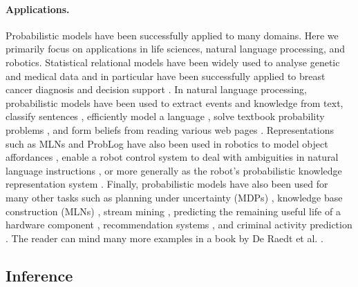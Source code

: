 \documentclass{article}
\begin{document}
\paragraph{Applications.}
Probabilistic models have been successfully applied to many domains. Here we
primarily focus on applications in life sciences, natural language processing,
and robotics. Statistical relational models have been widely used to analyse
genetic \cite{DBLP:journals/nar/MaeyerWRRM15,DBLP:journals/jcb/SakhanenkoG12}
and medical \cite{DBLP:conf/iaai/NatarajanKIJC13} data and in particular have
been successfully applied to breast cancer diagnosis and decision support
\cite{DBLP:conf/ilp/Corte-RealD017,DBLP:conf/pkdd/NassifKBPSC13}. In natural
language processing, probabilistic models have been used to extract events
\cite{DBLP:conf/emnlp/VenugopalCGN14} and knowledge
\cite{DBLP:conf/naacl/PoonV10} from text, classify sentences
\cite{DBLP:conf/emnlp/VerbekeAMFDR12}, efficiently model a language
\cite{DBLP:conf/icml/JerniteRS15}, solve textbook probability problems
\cite{DBLP:conf/ijcai/DriesKDBR17}, and form beliefs from reading various web
pages \cite{DBLP:conf/aaai/CarlsonBKSHM10}. Representations such as MLNs and
ProbLog have also been used in robotics to model object affordances
\cite{DBLP:conf/icra/MoldovanMOSR12,DBLP:conf/iros/MoldovanR14,DBLP:conf/ilp/MoldovanORMS11},
enable a robot control system to deal with ambiguities in natural language
instructions \cite{DBLP:journals/ras/BeetzJMT10}, or more generally as the
robot's probabilistic knowledge representation system
\cite{DBLP:conf/icra/JainMB09}. Finally, probabilistic models have also been
used for many other tasks such as planning under uncertainty (MDPs)
\cite{DBLP:journals/jair/BoutilierDH99}, knowledge base construction (MLNs)
\cite{DBLP:journals/ijswis/NiuZRS12}, stream mining
\cite{DBLP:conf/icdm/ChandraSKTA14}, predicting the remaining useful life of a
hardware component \cite{vlasselaer2012statistical}, recommendation systems
\cite{DBLP:journals/corr/YangKAGN16}, and criminal activity prediction
\cite{DBLP:conf/sdm/DelaneyFCWJ10}. The reader can mind many more examples in a
book by De Raedt et al. \cite{DBLP:series/synthesis/2016Raedt}.

\subsection{Inference}
\end{document}
